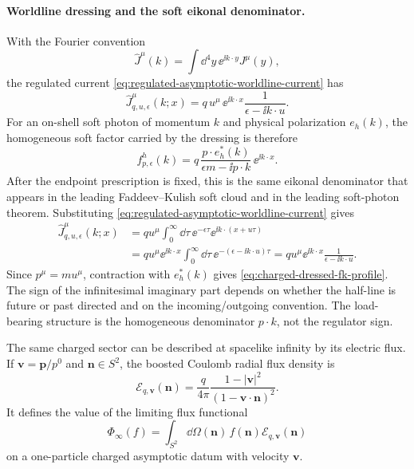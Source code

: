 \paragraph{Worldline dressing and the soft eikonal denominator.}
With the Fourier convention
\[
  \widehat J^\mu(k)=\int\dd^4y\,\ee^{\ii k\cdot y}J^\mu(y),
\]
the regulated current \eqref{eq:regulated-asymptotic-worldline-current} has
\begin{equation}
  \widehat J_{q,u,\epsilon}^\mu(k;x)
  =
  q\,u^\mu\,\ee^{\ii k\cdot x}
  \frac{1}{\epsilon-\ii k\cdot u}.
  \label{eq:worldline-current-fourier-transform}
\end{equation}
For an on-shell soft photon of momentum \(k\) and physical polarization
\(e_h(k)\), the homogeneous soft factor carried by the dressing is therefore
\begin{equation}
  f_{p,\epsilon}^h(k)
  =
  q\,\frac{p\cdot e_h^*(k)}{\epsilon m-\ii p\cdot k}\,
  \ee^{\ii k\cdot x}.
  \label{eq:charged-dressed-fk-profile}
\end{equation}
After the endpoint prescription is fixed, this is the same eikonal
denominator that appears in the leading Faddeev--Kulish soft cloud and in
the leading soft-photon theorem.
Substituting \eqref{eq:regulated-asymptotic-worldline-current} gives
\[
\begin{aligned}
  \widehat J_{q,u,\epsilon}^\mu(k;x)
  &=
  q u^\mu
  \int_0^\infty\dd\tau\,
  \ee^{-\epsilon\tau}
  \ee^{\ii k\cdot(x+u\tau)}
  \\
  &=
  q u^\mu\ee^{\ii k\cdot x}
  \int_0^\infty\dd\tau\,
  \ee^{-(\epsilon-\ii k\cdot u)\tau}
  =
  q u^\mu\ee^{\ii k\cdot x}
  \frac{1}{\epsilon-\ii k\cdot u}.
\end{aligned}
\]
Since \(p^\mu=mu^\mu\), contraction with \(e_h^*(k)\) gives
\eqref{eq:charged-dressed-fk-profile}.  The sign of the infinitesimal
imaginary part depends on whether the half-line is future or past directed
and on the incoming/outgoing convention.  The load-bearing structure is the
homogeneous denominator \(p\cdot k\), not the regulator sign.

The same charged sector can be described at spacelike infinity by its
electric flux.  If \(\mathbf v=\mathbf p/p^0\) and
\(\mathbf n\in S^2\), the boosted Coulomb radial flux density is
\begin{equation}
  \mathcal E_{q,\mathbf v}(\mathbf n)
  =
  \frac{q}{4\pi}
  \frac{1-|\mathbf v|^2}{(1-\mathbf v\cdot\mathbf n)^2}.
  \label{eq:charged-boosted-coulomb-flux-density-hr}
\end{equation}
It defines the value of the limiting flux functional
\[
  \Phi_\infty(f)=
  \int_{S^2}\dd\Omega(\mathbf n)\,
  f(\mathbf n)\mathcal E_{q,\mathbf v}(\mathbf n)
\]
on a one-particle charged asymptotic datum with velocity \(\mathbf v\).

